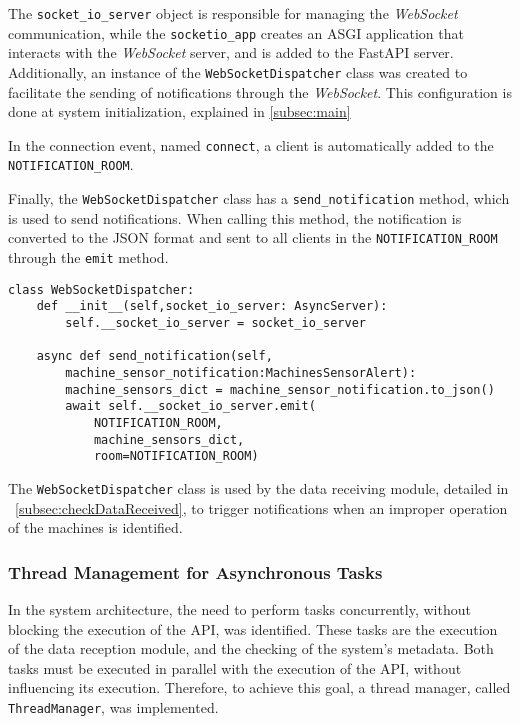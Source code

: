 The \texttt{socket\_io\_server} object is responsible for managing the \textit{WebSocket} communication, while the \texttt{socketio\_app} creates an \gls{ASGI} application that interacts with the \textit{WebSocket} server, and is added to the FastAPI server. Additionally, an instance of the \texttt{WebSocketDispatcher} class was created to facilitate the sending of notifications through the \textit{WebSocket}. This configuration is done at system initialization, explained in \ref{subsec:main}

In the connection event, named \texttt{connect}, a client is automatically added to the \texttt{NOTIFICATION\_ROOM}.

Finally, the \texttt{WebSocketDispatcher} class has a \texttt{send\_notification} method, which is used to send notifications. When calling this method, the notification is converted to the JSON format and sent to all clients in the \texttt{NOTIFICATION\_ROOM} through the \texttt{emit} method.

\begin{verbatim}
class WebSocketDispatcher:
    def __init__(self,socket_io_server: AsyncServer):
        self.__socket_io_server = socket_io_server
    
    async def send_notification(self,
        machine_sensor_notification:MachinesSensorAlert):
        machine_sensors_dict = machine_sensor_notification.to_json()
        await self.__socket_io_server.emit(
            NOTIFICATION_ROOM,
            machine_sensors_dict,
            room=NOTIFICATION_ROOM)
\end{verbatim}

The \texttt{WebSocketDispatcher} class is used by the data receiving module, detailed in ~\ref{subsec:checkDataReceived}, to trigger notifications when an improper operation of the machines is identified.

\subsubsection{Thread Management for Asynchronous Tasks}\label{subsubsec:ThreadManager}
In the system architecture, the need to perform tasks concurrently, without blocking the execution of the \gls{API}, was identified. These tasks are the execution of the data reception module, and the checking of the system's metadata. Both tasks must be executed in parallel with the execution of the \gls{API}, without influencing its execution. Therefore, to achieve this goal, a thread manager, called \texttt{ThreadManager}, was implemented.

